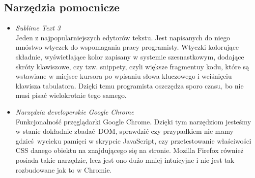   \subsection{Narzędzia pomocnicze}
    \begin{itemize}
      \item \emph{Sublime Text 3} \\ Jeden z najpopularniejszych edytorów tekstu. Jest napisanych do niego mnóstwo wtyczek do wspomagania pracy programisty. Wtyczki kolorujące składnie, wyświetlające kolor zapisany w systemie szesnastkowym, dodające skróty klawiszowe, czy tzw. snippety, czyli większe fragmentuy kodu, które są wstawiane w miejsce kursora po wpisaniu słowa kluczowego i wciśnięciu klawisza tabulatora. Dzięki temu programista oszczędza sporo czasu, bo nie musi pisać wielokrotnie tego samego.
      \item \emph{Narzędzia developerskie Google Chrome} \\ Funkcjonalność przęglądarki Google Chrome. Dzięki tym narzędziom jesteśmy w stanie dokładnie zbadać DOM, sprawdzić czy przypadkiem nie mamy gdzieś wycieku pamięci w skrypcie JavaScript, czy przetestowanie właściwości CSS danego obiektu na znajdującego się na stronie. Mozilla Firefox również posiada takie narzędzie, lecz jest ono dużo mniej intuicyjne i nie jest tak rozbudowane jak to w Chromie.
    \end{itemize}

